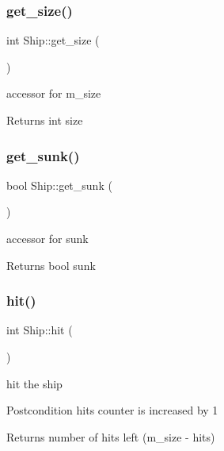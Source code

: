 \subsubsection{\texorpdfstring{get\_size()}{get\_size()}}
{\footnotesize\ttfamily int Ship\+::get\+\_\+size (\begin{DoxyParamCaption}{ }\end{DoxyParamCaption})}



accessor for m\+\_\+size 

\begin{DoxyReturn}{Returns}
int size 
\end{DoxyReturn}
\mbox{\label{classShip_a4fc2f7b7c31b58ab2ce82ffaef193d17}} 
\subsubsection{\texorpdfstring{get\_sunk()}{get\_sunk()}}
{\footnotesize\ttfamily bool Ship\+::get\+\_\+sunk (\begin{DoxyParamCaption}{ }\end{DoxyParamCaption})}



accessor for sunk 

\begin{DoxyReturn}{Returns}
bool sunk 
\end{DoxyReturn}
\mbox{\label{classShip_ad9e415b084ced1a4380f3dbae0765866}} 
\subsubsection{\texorpdfstring{hit()}{hit()}}
{\footnotesize\ttfamily int Ship\+::hit (\begin{DoxyParamCaption}{ }\end{DoxyParamCaption})}



hit the ship 

\begin{DoxyPostcond}{Postcondition}
hits counter is increased by 1 
\end{DoxyPostcond}
\begin{DoxyReturn}{Returns}
number of hits left (m\+\_\+size -\/ hits) 
\end{DoxyReturn}
\mbox{\label{classShip_a8da09394c4589df4e95e023c4ae43139}} 
